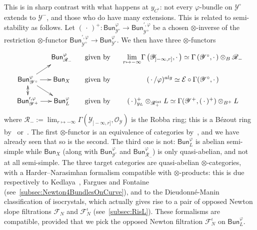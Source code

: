 \documentclass[11pt]{article}
\theoremstyle{definition}
\numberwithin{equation}{section}
\numberwithin{figure}{section}
\numberwithin{table}{section}
\newcommand{\Bun}{\mathsf{Bun}}
\begin{document}
\subsubsection{}\label{subsec:PhiBunY=0000B0}

This is in sharp contrast with what happens at $y_{C^{\flat}}$: not every $\varphi$-bundle on $\mathscr{Y}^{\circ}$ extends to $\mathscr{Y}^{-}$, and those who do have many extensions. This is related to semi-stability as follows. Let $({\,\cdot\,})^{+}:\Bun_{\mathscr{Y}^{\circ}}^{\varphi}\rightarrow\Bun_{\mathscr{Y}^{+}}^{\prime,\varphi}$ be a chosen $\otimes$-inverse of the restriction $\otimes$-functor $\Bun_{\mathscr{Y}^{+}}^{\prime,\varphi}\rightarrow\Bun_{\mathscr{Y}^{\circ}}^{\varphi}$. We then have three $\otimes$-functors
\[
\xymatrix@C=1pc@R=1pc{ & \Bun_{\mathscr{R}_{-}}^{\varphi} & \text{given by} & \underset{r\mapsto-\infty}{\lim}\Gamma\left(\mathscr{Y}_{]-\infty,r]},{\cdot\,}\right)\simeq\Gamma\left(\mathscr{Y}^{\circ},{\cdot\,}\right)\otimes_{B}\mathscr{R}_{-}\\
\Bun_{\mathscr{Y}^{\circ}}^{\varphi}\ar[ru]\ar[r]\ar[rd] & \Bun_{X} & \text{given by} & ({\,\cdot\,}/\varphi)^{alg}\simeq\mathcal{E}\circ\Gamma(\mathscr{Y}^{\circ},{\cdot\,})\\
\Bun_{\mathscr{Y}^{+}}^{\prime,\varphi}\ar[r]\ar@{<->}[u] & \Bun_{L}^{\varphi} & \text{given by} & ({\,\cdot\,})_{y_{L}}^{+}\otimes_{\mathscr{R}_{+}^{\mathrm{int}}}L\simeq\Gamma(\mathscr{Y}^{+},({\,\cdot\,})^{+})\otimes_{B^{+}}L }
\]
where $\mathscr{R}_{-}:=\lim_{r\mapsto-\infty}\Gamma(\mathscr{Y}_{]-\infty,r]},\mathscr{O}_{\mathscr{Y}})$ is the Robba ring; this is a B\'ezout ring by~\cite[3.5.8]{FaFo15} or~\cite[2.9.6]{Ke05}. The first $\otimes$-functor is an equivalence of categories by~\cite[11.2.22]{FaFo15}, and we have already seen that so is the second. The third one is not: $\Bun_{L}^{\varphi}$ is abelian semi-simple while $\Bun_{X}$ (along with $\Bun_{\mathscr{Y}^{\circ}}^{\varphi}$ and $\Bun_{\mathscr{R}_{-}}^{\varphi}$) is only quasi-abelian, and not at all semi-simple. The three target categories are quasi-abelian $\otimes$-categories, with a Harder--Narasimhan formalism compatible with $\otimes$-products: this is due respectively to Kedlaya~\cite{Ke05}, Fargues and Fontaine~\cite{FaFo15} (see~\ref{subsec:Newton4BundlesOnCurve}), and to the Dieudonn\'e-Manin classification of isocrystals, which actually gives rise to a pair of opposed Newton slope filtrations $\mathcal{F}_{N}$ and $\mathcal{F}_{N}^{\iota}$ (see~\ref{subsec:RisL}). These formalisms are compatible, provided that we pick the opposed Newton filtration $\mathcal{F}_{N}^{\iota}$ on $\Bun_{L}^{\varphi}$.
\end{document}
